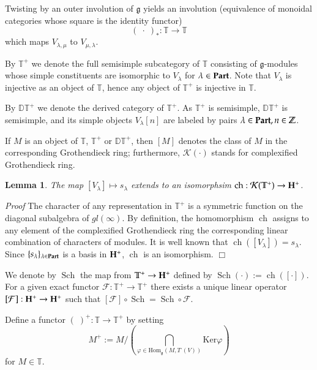 \documentclass[11pt]{amsart}
\newcounter{theorem}
\newtheorem{lemma}[theo]{Lemma}
\renewenvironment{proof}{ \emph{Proof}}{$\Box$}
\renewcommand{\gg}{\mathfrak{g}}
\renewcommand {\phi} {\varphi}
\newcommand{\Ker}{\mathrm{Ker}}
\newcommand{\Hom}{\mathrm{Hom}}
\newcommand{\field}[1]{\mathbb{#1}}
\begin{document}
Twisting by an outer involution of $\gg$ yields an involution (equivalence
of monoidal categories whose square is the identity
functor) $$(\;\cdot\;)_*: \mathbb T\to\mathbb T$$ which maps
$V_{\lambda,\mu}$ to $V_{\mu,\lambda}$.

By $\field{T}^+$ we denote the full semisimple subcategory
of $\field{T}$ consisting of $\mathfrak g$-modules whose simple constituents are isomorphic to $V_\lambda$ for
$\lambda\in\bold{Part}$.
Note that $V_\lambda$ is injective as an object of $\mathbb T$, hence
any object of $\mathbb T^+$ is injective in $\mathbb T$.


By $\mathbb {DT}^+$ we denote the derived category of $\mathbb T^+$. As $\mathbb T^+$ is semisimple, 
$\mathbb {DT}^+$ is semisimple, and its simple objects $V_\lambda[n]$
are labeled by pairs $\lambda\in\bold{Part},n\in\mathbb Z$.

If $M$ is an object of $\mathbb T$, $\mathbb T^+$ or $\mathbb {DT}^+$, then $[M]$ denotes the class of $M$ in the corresponding Grothendieck ring;
furthermore, $\mathcal K({\cdot})$ stands for complexified Grothendieck ring.
\begin{lemma}\label{grfock} The map $[V_\lambda]\mapsto s_\lambda$ extends to an isomorphsim $\operatorname{ch}:\mathcal K(\mathbb T^+)\to \bold{H}^+$.
\end{lemma} 
\begin{proof} The character of any representation in $\mathbb T^+$ is a symmetric function on the diagonal subalgebra
of $gl(\infty)$. By definition, the homomorphism $\operatorname{ch}$ assigns to any element of the complexified Grothendieck ring 
the corresponding linear combination of characters of modules. It is well known that $\operatorname{ch}([V_\lambda])=s_\lambda$.
Since $\{s_\lambda\}_{\lambda\in\bold{Part}}$ is a basis in $\bold{H}^+$, $\operatorname{ch}$ is an isomorphism.
\end{proof}

We denote by $\operatorname{Sch}$ the map from $\mathbb T^+\to \bold{H}^+$ defined by $\operatorname{Sch}(\cdot):=\operatorname{ch}([\cdot])$.
For a given exact functor $\mathcal F:\mathbb T^+\to\mathbb T^+$ there
exists a unique linear operator $[\mathcal F]:\bold{H}^+\to\bold{H}^+$
such that $[\mathcal F]\circ\operatorname{Sch}=\operatorname{Sch}\circ \mathcal F$.



Define a functor $(\;)^+:\field{T}\rightarrow\field{T}^+$ by setting
$$M^+:=M/(\bigcap_{\phi\in\Hom_\gg(M,T^\cdot(V))}\Ker\phi)$$ for
$M\in\mathbb T$.
\end{document}
